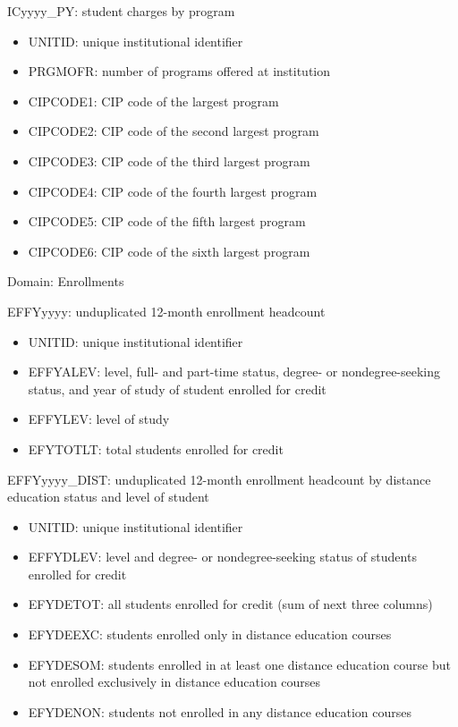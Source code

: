 \documentclass[sigconf, authorversion, nonacm]{acmart}
\begin{document}
        ICyyyy\_PY: student charges by program

        \begin{itemize}
            \item UNITID: unique institutional identifier
            \item PRGMOFR: number of programs offered at institution
            \item CIPCODE1: CIP code of the largest program
            \item CIPCODE2: CIP code of the second largest program
            \item CIPCODE3: CIP code of the third largest program
            \item CIPCODE4: CIP code of the fourth largest program
            \item CIPCODE5: CIP code of the fifth largest program
            \item CIPCODE6: CIP code of the sixth largest program
        \end{itemize}

        Domain: Enrollments

        EFFYyyyy: unduplicated 12-month enrollment headcount

        \begin{itemize}
            \item UNITID: unique institutional identifier
            \item EFFYALEV: level, full- and part-time status, degree- or nondegree-seeking status, and year of study of student enrolled for credit
            \item EFFYLEV: level of study
            \item EFYTOTLT: total students enrolled for credit
        \end{itemize}

        EFFYyyyy\_DIST: unduplicated 12-month enrollment headcount by distance education status and level of student

        \begin{itemize}
            \item UNITID: unique institutional identifier
            \item EFFYDLEV: level and degree- or nondegree-seeking status of students enrolled for credit
            \item EFYDETOT: all students enrolled for credit (sum of next three columns)
            \item EFYDEEXC: students enrolled only in distance education courses
            \item EFYDESOM: students enrolled in at least one distance education course but not enrolled exclusively in distance education courses
            \item EFYDENON: students not enrolled in any distance education courses
        \end{itemize}
\end{document}
